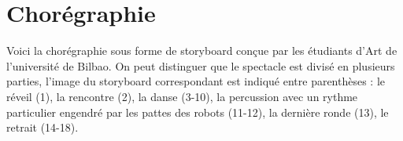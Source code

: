 
\section{Chorégraphie}
Voici la chorégraphie sous forme de storyboard conçue par les étudiants d'Art de l'université de Bilbao. On peut distinguer que le spectacle est divisé en plusieurs parties, l'image du storyboard correspondant est indiqué entre parenthèses : le réveil (1), la rencontre (2), la danse (3-10), la percussion avec un rythme particulier engendré par les pattes des robots (11-12), la dernière ronde (13), le retrait (14-18).

\hspace*{-2cm}

